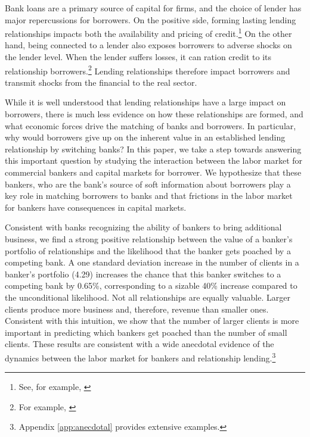 


Bank loans are a primary source of capital for firms, and the choice of lender has major repercussions for borrowers. On the positive side, forming lasting lending relationships impacts both the availability and pricing of credit.\footnote{See, for example, \citep{Diamond.1984, Sharpe.1990, Diamond.1991, Rajan.1992, Petersen.1994, Berger.1995, Bharath.2007, Ioannidou.2010}} On the other hand, being connected to a lender also exposes borrowers to adverse shocks on the lender level. When the lender suffers losses, it can ration credit to its relationship borrowers.\footnote{For example, \citep{Holmstrom1997, khwaja2008tracing, leary2009bank, Ivashina.2010, Chava2011, Lin2013, ChodorowReich.2014}} Lending relationships therefore impact borrowers and transmit shocks from the financial to the real sector. 

While it is well understood that lending relationships have a large impact on borrowers, %
there is much less evidence on how these relationships are formed, and what economic forces drive the matching of banks and borrowers. 
In particular, why would borrowers give up on the inherent value in an established lending relationship by switching banks? In this paper, we take a step towards answering this important question by studying the interaction between the labor market for commercial bankers and capital markets for borrower. We hypothesize that these bankers, who are the bank's source of soft information about borrowers \citep{Berger2002} play a key role in matching borrowers to banks and that frictions in the labor market for bankers have consequences in capital markets. 


Consistent with banks recognizing the ability of bankers to bring additional business, we find a strong positive relationship between the value of a banker's portfolio of relationships and the likelihood that the banker gets poached by a competing bank. A one standard deviation increase in the number of clients in a banker's portfolio (4.29) increases the chance that this banker switches to a competing bank by 0.65\%, %
corresponding to a sizable 40\% increase compared to the unconditional likelihood. Not all relationships are equally valuable. Larger clients produce more business and, therefore, revenue than smaller ones. Consistent with this intuition, we show that the number of larger clients is more important in predicting which bankers get poached than the number of small clients. These results are consistent with a wide anecdotal evidence of the dynamics between the labor market for bankers and relationship lending.\footnote{Appendix \ref{app:anecdotal} provides extensive examples.}

